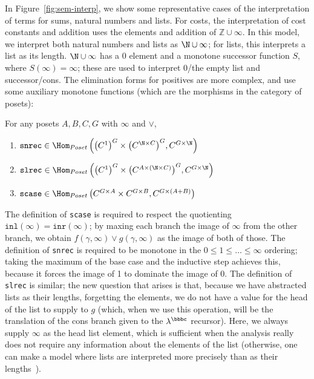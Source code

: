 In Figure~\ref{fig:sem-interp}, we show some representative cases of the
interpretation of terms for sums, natural numbers and lists.  For costs,
the interpretation of cost constants and addition uses the elements and
addition of $\mathbb{Z} \cup \infty$.
In this model, we interpret both natural numbers and
lists as $\N \cup \infty$; for lists, this interprets a list as its
length.  $\N \cup \infty$ has a 0 element and a monotone successor
function $S$, where $S(\infty) = \infty$; these are used to interpret
0/the empty list and successor/cons.
The elimination forms for positives are more complex, and use some
auxiliary monotone functions (which are the morphisms in the category of
posets):
\begin{theorem}\label{thm:aux-sem-lemma}
For any posets $A,B,C,G$ with $\infty$ and $\vee$,
\begin{enumerate}
  \item $\texttt{snrec} \in \Hom_{Poset}\left({\left(C^1\right)}^G\times {\left(C^{\N\times C}\right)}^G,C^{G\times\N}\right)$
  \item $\texttt{slrec} \in  \Hom_{Poset}\left({\left(C^1\right)^G} \times {\left(C^{A \times (\N \times C)}\right)^G},C^{G \times \N}\right)$
  \item $\texttt{scase} \in \Hom_{Poset}\left(C^{G \times A}\times C^{G \times B},C^{G\times(A + B)}\right)$
\end{enumerate}
\end{theorem}


The definition of \texttt{scase} is required to respect the quotienting
$\texttt{inl}(\infty) = \texttt{inr}(\infty)$; by maxing each branch the
image of $\infty$ from the other branch, we obtain $f(\gamma,\infty)
\vee g(\gamma,\infty)$ as the image of both of those.  The definition of
\texttt{snrec} is required to be monotone in the $0 \le 1 \le \ldots \le
\infty$ ordering; taking the maximum of the base case and the inductive
step achieves this, because it forces the image of 1 to dominate the
image of 0.  The definition of \texttt{slrec} is similar; the new
question that arises is that, because we have abstracted lists as their
lengths, forgetting the elements, we do not have a value for the head of
the list to supply to $g$ (which, when we use this operation, will be
the translation of the cons branch given to the $\lambda^\bbbc$
recursor).  Here, we always supply $\infty$ as the head list element,
which is sufficient when the analysis really does not require any
information about the elements of the list (otherwise, one can make a
model where lists are interpreted more precisely than as their
lengths~\cite{danner-et-al:icfp15,danner-licata:jfp-in-prep}).

